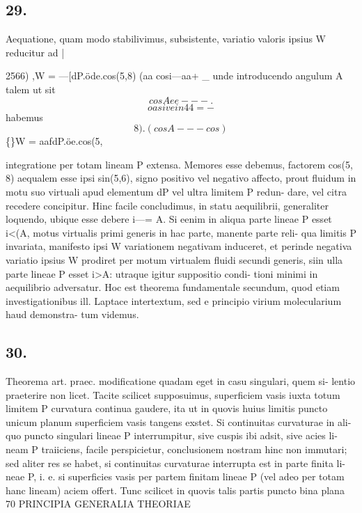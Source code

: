 \documentclass[12pt,a4paper]{article}
\begin{document}
\subsection*{29.}

Aequatione, quam modo stabilivimus, subsistente, variatio valoris ipsius W
reducitur ad                                                              |

2566)
,W = ---[dP.öde.cos(5,8) (aa cosi---aa+
\_   unde introducendo angulum A talem ut sit
\[                        cos    A ee   ---.\]
\[                                         oa     sive        in44=-\]
habemus
\[                                        8). (cos A--- cos)\]
\textdegree\{\}W = aafdP.öe.cos(5,

integratione per totam lineam P extensa.     Memores esse debemus, factorem
cos(5, 8) aequalem esse ipsi sin(5,6), signo positivo vel negativo affecto, prout
fluidum in motu suo virtuali apud elementum                dP    vel ultra limitem   P redun-
dare, vel citra recedere concipitur.      Hinc facile concludimus, in statu aequilibrii,
generaliter loquendo, ubique esse debere i---= A. Si eenim in aliqua parte lineae
P esset i<(A, motus virtualis primi generis in hac parte, manente parte reli-
qua limitis P invariata,      manifesto ipsi        W   variationem negativam induceret,      et
perinde negativa variatio ipsius      W   prodiret per motum virtualem fluidi secundi
generis, siin ulla parte lineae P esset i>A: utraque igitur suppositio condi-
tioni minimi in aequilibrio adversatur.
Hoc est theorema       fundamentale      secundum,        quod etiam    investigationibus
ill. Laptace intertextum, sed e principio virium molecularium haud demonstra-
tum videmus.



\subsection*{30.}

Theorema art. praec. modificatione quadam eget in casu singulari, quem si-
lentio praeterire non licet. Tacite scilicet supposuimus, superficiem vasis iuxta
totum limitem P curvatura continua gaudere, ita ut in quovis huius limitis puncto
unicum planum superficiem vasis tangens exstet. Si continuitas curvaturae in ali-
quo puncto singulari lineae P interrumpitur, sive cuspis ibi adsit, sive acies li-
neam P traiiciens, facile perspicietur, conclusionem nostram hinc non immutari;
sed aliter res se habet,    si continuitas curvaturae       interrupta   est in parte finita li-
neae P, i. e. si superficies vasis per partem finitam lineae P (vel adeo per totam
hanc lineam) aciem offert.        Tunc scilicet in quovis talis partis puncto bina plana
70                               PRINCIPIA   GENERALIA   THEORIAE
\end{document}
